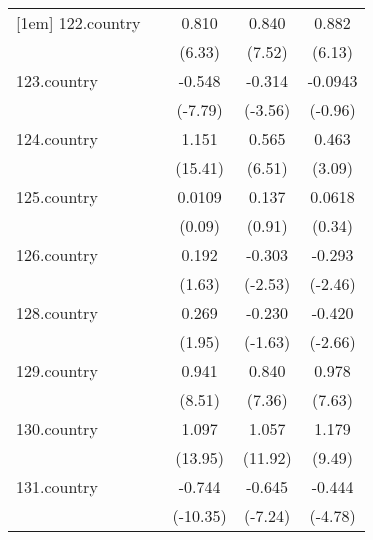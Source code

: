 {\begin{tabular}{l*{4}{c}}
[1em]
122.country &                     &       0.810\sym{***}&       0.840\sym{***}&       0.882\sym{***}\\
            &                     &      (6.33)         &      (7.52)         &      (6.13)         \\
[1em]
123.country &                     &      -0.548\sym{***}&      -0.314\sym{***}&     -0.0943         \\
            &                     &     (-7.79)         &     (-3.56)         &     (-0.96)         \\
[1em]
124.country &                     &       1.151\sym{***}&       0.565\sym{***}&       0.463\sym{**} \\
            &                     &     (15.41)         &      (6.51)         &      (3.09)         \\
[1em]
125.country &                     &      0.0109         &       0.137         &      0.0618         \\
            &                     &      (0.09)         &      (0.91)         &      (0.34)         \\
[1em]
126.country &                     &       0.192         &      -0.303\sym{*}  &      -0.293\sym{*}  \\
            &                     &      (1.63)         &     (-2.53)         &     (-2.46)         \\
[1em]
128.country &                     &       0.269         &      -0.230         &      -0.420\sym{**} \\
            &                     &      (1.95)         &     (-1.63)         &     (-2.66)         \\
[1em]
129.country &                     &       0.941\sym{***}&       0.840\sym{***}&       0.978\sym{***}\\
            &                     &      (8.51)         &      (7.36)         &      (7.63)         \\
[1em]
130.country &                     &       1.097\sym{***}&       1.057\sym{***}&       1.179\sym{***}\\
            &                     &     (13.95)         &     (11.92)         &      (9.49)         \\
[1em]
131.country &                     &      -0.744\sym{***}&      -0.645\sym{***}&      -0.444\sym{***}\\
            &                     &    (-10.35)         &     (-7.24)         &     (-4.78)         \\

\end{tabular}}

